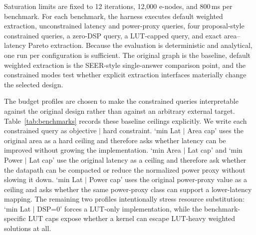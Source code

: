 \documentclass[sigplan,10pt,review]{acmart}
\begin{document}
\begin{table}[t]
\caption{Benchmark baselines and per-query hard-budget ceilings. Metrics use $A/L/P/D/U$ for area, latency, normalized power proxy, DSP count, and LUT count. The cap tuple lists the ceilings used by separate constrained queries: original area, latency, and power-proxy values; zero-DSP stress cap; and benchmark-specific LUT cap.}
\label{tab:benchmarks}
\centering
\footnotesize
\setlength{\tabcolsep}{3pt}
\end{table}

Saturation limits are fixed to 12 iterations, 12{,}000 e-nodes, and 800\,ms per benchmark. For each benchmark, the harness executes default weighted extraction, unconstrained latency and power-proxy queries, four proposal-style constrained queries, a zero-DSP query, a LUT-capped query, and exact area--latency Pareto extraction. Because the evaluation is deterministic and analytical, one run per configuration is sufficient. The original graph is the baseline, default weighted extraction is the SEER-style single-answer comparison point, and the constrained modes test whether explicit extraction interfaces materially change the selected design.

The budget profiles are chosen to make the constrained queries interpretable against the original design rather than against an arbitrary external target. Table~\ref{tab:benchmarks} records these baseline ceilings explicitly. We write each constrained query as objective $|$ hard constraint. `min Lat $|$ Area cap' uses the original area as a hard ceiling and therefore asks whether latency can be improved without growing the implementation. `min Area $|$ Lat cap' and `min Power $|$ Lat cap' use the original latency as a ceiling and therefore ask whether the datapath can be compacted or reduce the normalized power proxy without slowing it down. `min Lat $|$ Power cap' uses the original power-proxy value as a ceiling and asks whether the same power-proxy class can support a lower-latency mapping. The remaining two profiles intentionally stress resource substitution: `min Lat $|$ DSP=0' forces a LUT-only implementation, while the benchmark-specific LUT caps expose whether a kernel can escape LUT-heavy weighted solutions at all.
\end{document}
